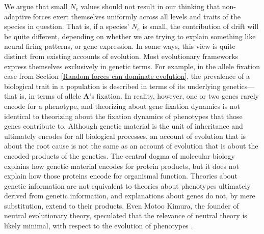 \documentclass[twocolumn]{article}
\begin{document}
We argue that small $N_e$ values should not result in our thinking that non-adaptive forces exert themselves uniformly across all levels and traits of the species in question. That is, if a species' $N_e$ is small, the contribution of drift will be quite different, depending on whether we are trying to explain something like neural firing patterns, or gene expression. In some ways, this view is quite distinct from existing accounts of evolution. Most evolutionary frameworks express themselves exclusively in genetic terms. For example, in the allele fixation case from Section \ref{Random forces can dominate evolution}, the prevalence of a biological trait in a population is described in terms of its underlying genetics---that is, in terms of allele \textbf{A}'s fixation. In reality, however, one or two genes rarely encode for a phenotype, and theorizing about gene fixation dynamics is not identical to theorizing about the fixation dynamics of phenotypes that those genes contribute to. Although genetic material is the unit of inheritance and ultimately encodes for all biological processes, an account of evolution that is about the root cause is not the same as an account of evolution that is about the encoded products of the genetics. The central dogma of molecular biology \cite{crick_1970} explains how genetic material encodes for protein products, but it does not explain how those proteins encode for organismal function. Theories about genetic information are not equivalent to theories about phenotypes ultimately derived from genetic information, and explanations about genes do not, by mere substitution, extend to their products. Even Motoo Kimura, the founder of neutral evolutionary theory, speculated that the relevance of neutral theory is likely minimal, with respect to the evolution of phenotypes \cite{kimura1983neutral, kimura2020my, Zhang_2018}.
\end{document}
